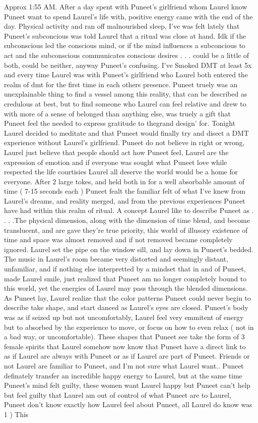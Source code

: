 \documentclass[12pt]{book}
\begin{document}
Approx 1:55 AM. After a day spent with Puneet's girlfriend whom Laurel know Puneet want to spend Laurel's life with, positive energy came with the end of the day. Physical activity and ran off malnourished sleep, I've was felt lately that Puneet's subconcious was told Laurel that a ritual was close at hand. Idk if the subconscious led the conscious mind, or if the mind influences a subconcious to act and the subconscious communicates conscious desires . . .  could be a little of both, could be neither, anyway Puneet's confusing. I've Smoked DMT at least 5x and every time Laurel was with Puneet's girlfriend who Laurel both entered the realm of dmt for the first time in each others presence. Puneet truely was an unexplainable thing to find a vessel among this reality, that can be described as credulous at best, but to find someone who Laurel can feel relative and drew to with more of a sense of belonged than anything else, was truely a gift that Puneet feel the needed to express gratitude to thegrand design' for. Tonight Laurel decided to meditate and that Puneet would finally try and disect a DMT experience without Laurel's girlfriend. Puneet do not believe in right or wrong, Laurel just believe that people should act how Puneet feel, Laurel are the expression of emotion and if everyone was sought what Puneet love while respected the life courtisies Laurel all deserve the world would be a home for everyone. After 2 large tokes, and held both in for a well absorbable amount of time ( 7-15 seconds each ) Puneet fealt the familiar felt of what I've knew from Laurel's dreams, and reality merged, and from the previous experiences Puneet have had within this realm of ritual. A concept Laurel like to describe Puneet as . . .  .The physical dimension, along with the dimension of time blend, and become translucent, and are gave they're true priority, this world of illusory existence of time and space was almost removed and if not removed became completely ignored. Laurel set the pipe on the window sill, and lay down in Puneet's bedded. The music in Laurel's room became very distorted and seemingly distant, unfamiliar, and if nothing else interpretted by a mindset that in and of Puneet, made Laurel smile, just realized that Puneet am no longer completely bound to this world, yet the energies of Laurel may pass through the blended dimensions. As Puneet lay, Laurel realize that the color patterns Puneet could never begin to describe take shape, and start danced as Laurel's eyes are closed. Puneet's body was as if seized up but not uncomfortably, Laurel feel very emmitent of energy but to absorbed by the experience to move, or focus on how to even relax ( not in a bad way, or uncomfortable). These shapes that Puneet see take the form of 3 female spirits that Laurel somehow now know that Puneet have a direct link to as if Laurel are always with Puneet or as if Laurel are part of Puneet. Friends or not Laurel are familiar to Puneet, and I'm not sure what Laurel want.. Puneet definately transfer an incredible happy energy to Laurel, but at the same time Puneet's mind felt guilty, these women want Laurel happy but Puneet can't help but feel guilty that Laurel am out of control of what Puneet are to Laurel, Puneet don't know exactly how Laurel feel about Puneet, all Laurel do know was 1 ) This 
\end{document}
